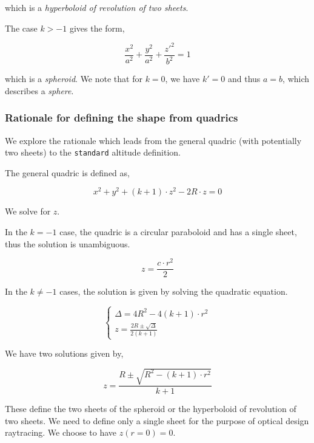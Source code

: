 which is a \emph{hyperboloid of revolution of two sheets}.

The case $k > -1$ gives the form,

\begin{equation}
\frac{x^2}{a^2} + \frac{y^2}{a^2} + \frac{z'^2}{b^2} = 1
\end{equation}

which is a \emph{spheroid}. We note that for $k=0$, we have
$k'=0$ and thus $a=b$, which describes a \emph{sphere}.

\subsubsection{Rationale for defining the shape from quadrics}
We explore the rationale which leads from the general quadric (with potentially
two sheets) to the \lstinline{standard} altitude definition.

The general quadric is defined as,

\begin{equation}
x^2 + y^2 + (k+1) \cdot z^2 - 2 R \cdot z = 0
\end{equation}

We solve for $z$.

In the $k=-1$ case, the quadric is a circular paraboloid and has a single
sheet, thus the solution is unambiguous.

\begin{equation}
z = \frac{c \cdot r^2}{2}
\end{equation}

In the $k\neq-1$ cases, the solution is given by solving the quadratic equation.

\begin{equation} \begin{cases}
\Delta = 4 R^2 - 4 (k+1) \cdot r^2 \\
z = \frac{2R \pm \sqrt{\Delta}}{2(k+1)}
\end{cases} \end{equation}

We have two solutions given by,

\begin{equation}
z = \frac{R \pm \sqrt{R^2 - (k+1) \cdot r^2}}{k + 1}
\end{equation}

These define the two sheets of the spheroid or the hyperboloid of revolution of
two sheets. We need to define only a single sheet for the purpose of optical
design raytracing. We choose to have $z(r=0) = 0$.

